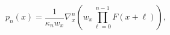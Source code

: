 \[p_{n}(x)=\frac{1}{\kappa_{n}w_{x}}\nabla_{x}^{n}\left(w_{x}\prod_{\ell=0}^{n-1%
}F(x+\ell)\right),\]